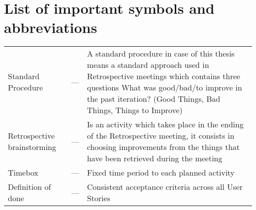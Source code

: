 \chapter*{List of important symbols and abbreviations}

\noindent
\begin{tabularx}{\textwidth}{p{4.5cm}p{0.75cm}X}
	Standard Procedure & ---	& A standard procedure in case of this thesis means a standard approach used in Retrospective meetings which contains three questions What was good/bad/to improve in the past iteration? (Good Things, Bad Things, Things to Improve) \\
	Retrospective brainstorming & ---	& Is an activity which takes place in the ending of the Retrospective meeting, it consists in choosing improvements from the things that have been retrieved during the meeting \\
	Timebox	& ---	& Fixed time period to each planned activity \\
	Definition of done & ---	& Consistent acceptance criteria across all User Stories
\end{tabularx}
